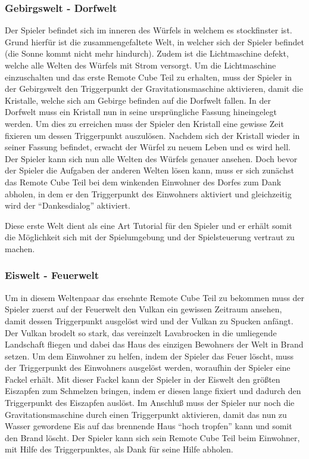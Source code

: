 \subsubsection{Gebirgswelt - Dorfwelt}
Der Spieler befindet sich im inneren des Würfels in welchem es stockfinster ist. Grund hierfür ist die zusammengefaltete Welt, in welcher sich der Spieler befindet (die Sonne kommt nicht mehr hindurch). Zudem ist die Lichtmaschine defekt, welche alle Welten des Würfels mit Strom versorgt. Um die Lichtmaschine einzuschalten und das erste Remote Cube Teil zu erhalten, muss der Spieler in der Gebirgswelt den Triggerpunkt der Gravitationsmaschine aktivieren, damit die Kristalle, welche sich am Gebirge befinden auf die Dorfwelt fallen. In der Dorfwelt muss ein Kristall nun in seine ursprüngliche Fassung hineingelegt werden. Um dies zu erreichen muss der Spieler den Kristall eine gewisse Zeit fixieren um dessen Triggerpunkt auszulösen. Nachdem sich der Kristall wieder in seiner Fassung befindet, erwacht der Würfel zu neuem Leben und es wird hell. Der Spieler kann sich nun alle Welten des Würfels genauer ansehen. Doch bevor der Spieler die Aufgaben der anderen Welten lösen kann, muss er sich zunächst das Remote Cube Teil bei dem winkenden Einwohner des Dorfes zum Dank abholen, in dem er den Triggerpunkt des Einwohners aktiviert und gleichzeitig wird der \enquote{Dankesdialog} aktiviert.


Diese erste Welt dient als eine Art Tutorial für den Spieler und er erhält somit die Möglichkeit sich mit der Spielumgebung und der Spielsteuerung vertraut zu machen.

\subsubsection{Eiswelt - Feuerwelt}
Um in diesem Weltenpaar das ersehnte Remote Cube Teil zu bekommen muss der Spieler zuerst auf der Feuerwelt den Vulkan ein gewissen Zeitraum ansehen, damit dessen Triggerpunkt ausgelöst wird und der Vulkan zu Spucken anfängt. Der Vulkan brodelt so stark, das vereinzelt Lavabrocken in die umliegende Landschaft fliegen und dabei das Haus des einzigen Bewohners der Welt in Brand setzen. Um dem Einwohner zu helfen, indem der Spieler das Feuer löscht, muss der Triggerpunkt des Einwohners ausgelöst werden, woraufhin der Spieler eine Fackel erhält. Mit dieser Fackel kann der Spieler in der Eiswelt den größten Eiszapfen zum Schmelzen bringen, indem er diesen lange fixiert und dadurch den Triggerpunkt des Eiszapfen auslöst. Im Anschluß muss der Spieler nur noch die Gravitationsmaschine durch einen Triggerpunkt aktivieren, damit das nun zu Wasser gewordene Eis auf das brennende Haus \enquote{hoch tropfen} kann und somit den Brand löscht. Der Spieler kann sich sein Remote Cube Teil beim Einwohner, mit Hilfe des Triggerpunktes, als Dank für seine Hilfe abholen.

